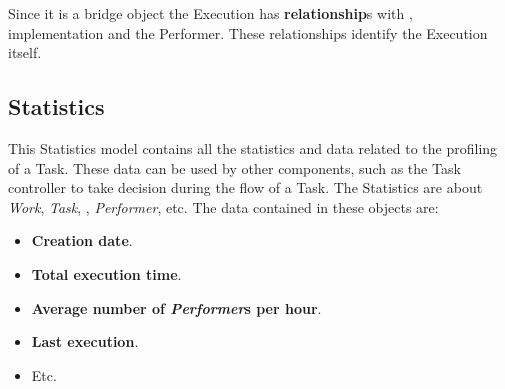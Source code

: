 Since it is a bridge object the Execution has \textbf{relationship}s with 
\utask{}, \utask{} implementation and the Performer. These relationships
identify the Execution itself.



\subsection{Statistics}
This Statistics model contains all the statistics and data related to the profiling
of a Task. These data can be used by other components, such as the Task controller
to take decision during the flow of a Task. The Statistics are about \emph{Work},
\emph{Task}, \emph{\utask{}}, \emph{Performer}, etc. The data contained in these
objects are:
\begin{itemize}
    \item \textbf{Creation date}.
    \item \textbf{Total execution time}.
    \item \textbf{Average number of \emph{Performer}s per hour}.
    \item \textbf{Last execution}.
    \item Etc.
\end{itemize}
